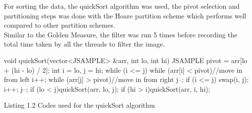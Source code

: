 For sorting the data, the quickSort algorithm was used, the pivot selection and
partitioning steps was done with the Hoare partition scheme\cite{hoare} which performs
well compared to other partition schemes.\\

Similar to the Golden Measure, the filter was run 5 times before recording the total time taken by all the threads to filter the image.

\begin{Matlab}
void quickSort(vector<JSAMPLE> &arr, int lo, int hi) {
    JSAMPLE pivot = arr[lo + (hi - lo) / 2];
    int i = lo, j = hi;
    while (i <= j) {
        while (arr[i] < pivot)//move in from left
            i++;
        while (arr[j] > pivot)//move in from right
            j--;
        if (i <= j) {
            swap(i, j);
            i++;
            j--;
        }
    }
    if (lo < j)quickSort(arr, lo, j);
    if (hi > i)quickSort(arr, i, hi);
}
\end{Matlab}
Listing 1.2 Codes used for the quickSort algorithm
